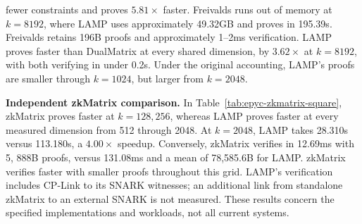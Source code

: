 \documentclass[conference,compsoc]{IEEEtran}
\makeatletter
\newif\ifshowrevisions
\newenvironment{revblock}[1][]
  {%
    \ifshowrevisions
      \begin{tcolorbox}[
        breakable,
        colback=revisionyellow,
        colframe=revisionyellow,
        boxrule=0pt,
        arc=0pt,
        left=2pt,
        right=2pt,
        top=2pt,
        bottom=2pt,
        before skip=2pt,
        after skip=2pt,
        #1
      ]
    \fi
  }
  {%
    \ifshowrevisions
      \end{tcolorbox}
    \fi
  }
\newcommand{\protocol}{\textsf{LAMP}}   %
\theoremstyle{plain}
\theoremstyle{definition}
\theoremstyle{remark}
\providecommand{\DIFaddtex}[1]{{\protect\color{blue}\uwave{#1}}} %
\providecommand{\DIFdeltex}[1]{{\protect\color{red}\sout{#1}}} %
\providecommand{\DIFaddbegin}{} %
\providecommand{\DIFaddend}{} %
\providecommand{\DIFdelbegin}{} %
\providecommand{\DIFdelend}{} %
\providecommand{\DIFadd}[1]{\texorpdfstring{\DIFaddtex{#1}}{#1}} %
\providecommand{\DIFdel}[1]{\texorpdfstring{\DIFdeltex{#1}}{}} %
\let\sout@orig\sout %
\renewcommand{\sout}[1]{\ifmmode\text{\sout@orig{\ensuremath{#1}}}\else\sout@orig{#1}\fi} %
\renewcommand{\DIFaddtex}[1]{{\protect\color{DiffBlue}#1}}
\renewcommand{\DIFdeltex}[1]{}
\makeatother
\begin{document}
\begin{revblock}
\DIFdel{Across the range shared by \(\protocol\) and DualMatrix, \(2^7\leq k\leq2^{13}\), \(\protocol\) achieves a shorter proving time at every
  measured matrix dimension.
At \(k=2^8\), \(\protocol\) requires }%
\DIFdel{seconds, whereas DualMatrix requires \(4.81\) seconds, making \(\protocol\)
  approximately }%
\DIFdelend \DIFaddbegin \DIFadd{fewer constraints
and proves \(5.81\times\) }\DIFaddend faster. \DIFdelbegin \DIFdel{The gap increases with the matrix
  dimension: at \(k=2^{13}\),
the respective proving times are }%
\DIFdel{seconds
  and \(707.43\) seconds, giving \(\protocol\) a }%
\DIFdel{speedup. Verification times are comparable and
remain below \(0.2\) seconds for both
  systems, with equal reported times at }%
\DIFdel{and lower times for \(\protocol\) at the remaining dimensions. }\DIFdelend \DIFaddbegin \DIFadd{Freivalds runs out of memory at \(k=8192\),
where LAMP uses approximately 49.32GB and proves in 195.39s. Freivalds retains
196B proofs and approximately 1--2ms verification. LAMP proves faster than
DualMatrix at every shared dimension, by \(3.62\times\) at \(k=8192\), with both
verifying in under 0.2s. Under the original accounting, LAMP's proofs are
smaller through \(k=1024\), but larger from \(k=2048\).
}\DIFaddend 

\DIFdelbegin \DIFdel{Proof size exhibits the opposite trend. From \(k=2^8\) }\DIFdelend \DIFaddbegin \noindent\textbf{\DIFadd{Independent zkMatrix comparison.}}
\DIFadd{In Table~\ref{tab:epyc-zkmatrix-square}, zkMatrix proves faster at
\(k=128,256\), whereas LAMP proves faster at every measured dimension from
512 }\DIFaddend through \DIFdelbegin \DIFdel{\(k=2^{10}\)}\DIFdelend \DIFaddbegin \DIFadd{2048. At \(k=2048\), LAMP takes 28.310s versus 113.180s, a
\(4.00\times\) speedup. Conversely, zkMatrix verifies in 12.69ms with 5}\DIFaddend ,\DIFdelbegin \DIFdel{\(\protocol\) produces smaller proofs than DualMatrix. Starting at
  \(k=2^{11}\), however, the proofs generated by \(\protocol\) become larger.
For example, at \(k=2^{13}\), the proof sizes are }%
\DIFdel{B for
  \(\protocol\) and \(106{,}400\) B for DualMatrix.
These results demonstrate
  that \(\protocol\) provides faster proof generation and comparable
  verification times relative to DualMatrix, at the cost of larger proofs for sufficiently
  large matrices}\DIFdelend \DIFaddbegin \DIFadd{888B
proofs, versus 131.08ms and a mean of 78,585.6B for LAMP. zkMatrix verifies
faster with smaller proofs throughout this grid. LAMP's verification includes
CP-Link to its SNARK witnesses; an additional link from standalone zkMatrix
to an external SNARK is not measured. These results concern the specified
implementations and workloads, not all current systems.
}


\end{revblock}
\end{document}
